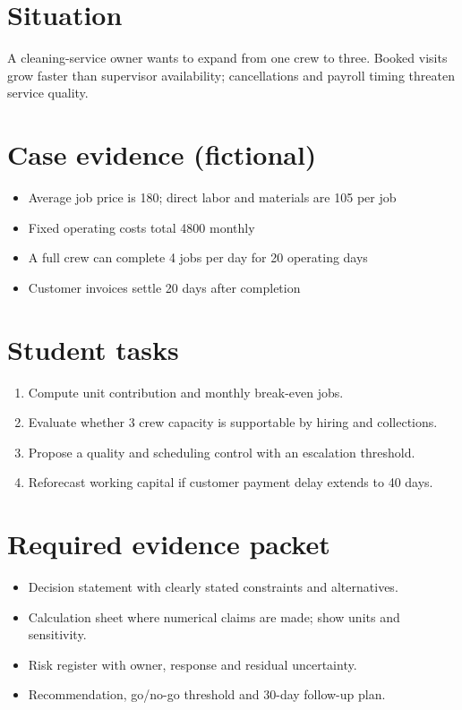 \documentclass[11pt]{article}
\begin{document}
\SuiteOpen
\section{Situation}
A cleaning-service owner wants to expand from one crew to three. Booked visits grow faster than supervisor availability; cancellations and payroll timing threaten service quality.
\section{Case evidence (fictional)}
\begin{itemize}[leftmargin=*,itemsep=3pt]
\item Average job price is 180; direct labor and materials are 105 per job
\item Fixed operating costs total 4800 monthly
\item A full crew can complete 4 jobs per day for 20 operating days
\item Customer invoices settle 20 days after completion
\end{itemize}

\section{Student tasks}
\begin{enumerate}[leftmargin=*,itemsep=5pt]
\item Compute unit contribution and monthly break-even jobs.
\item Evaluate whether 3 crew capacity is supportable by hiring and collections.
\item Propose a quality and scheduling control with an escalation threshold.
\item Reforecast working capital if customer payment delay extends to 40 days.
\end{enumerate}

\section{Required evidence packet}
\begin{itemize}[leftmargin=*,itemsep=3pt]
\item Decision statement with clearly stated constraints and alternatives.
\item Calculation sheet where numerical claims are made; show units and sensitivity.
\item Risk register with owner, response and residual uncertainty.
\item Recommendation, go/no-go threshold and 30-day follow-up plan.
\end{itemize}
\end{document}
